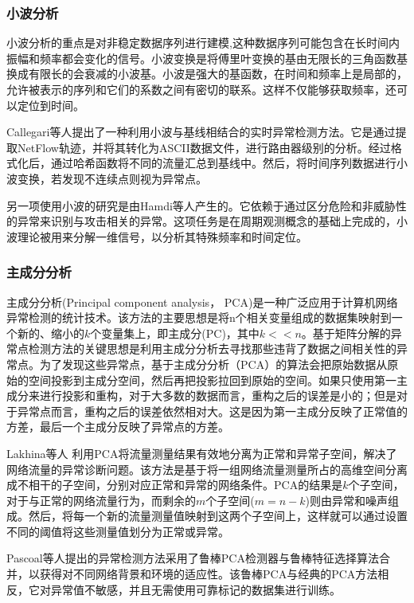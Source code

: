\subsubsection{小波分析} 
小波分析的重点是对非稳定数据序列进行建模,这种数据序列可能包含在长时间内振幅和频率都会变化的信号。小波变换是将傅里叶变换的基由无限长的三角函数基换成有限长的会衰减的小波基。小波是强大的基函数，在时间和频率上是局部的，允许被表示的序列和它们的系数之间有密切的联系。这样不仅能够获取频率，还可以定位到时间。


Callegari等人\cite{callegari2011combining}提出了一种利用小波与基线相结合的实时异常检测方法。它是通过提取NetFlow轨迹，并将其转化为ASCII数据文件，进行路由器级别的分析。经过格式化后，通过哈希函数将不同的流量汇总到基线中。然后，将时间序列数据进行小波变换，若发现不连续点则视为异常点。

另一项使用小波的研究是由Hamdi等人\cite{hamdi2007detecting}产生的。它依赖于通过区分危险和非威胁性的异常来识别与攻击相关的异常。这项任务是在周期观测概念的基础上完成的，小波理论被用来分解一维信号，以分析其特殊频率和时间定位。

\subsubsection{主成分分析}
主成分分析(Principal component analysis， PCA)是一种广泛应用于计算机网络异常检测的统计技术。该方法的主要思想是将n个相关变量组成的数据集映射到一个新的、缩小的$k$个变量集上，即主成分(PC)，其中$k<<n$。基于矩阵分解的异常点检测方法的关键思想是利用主成分分析去寻找那些违背了数据之间相关性的异常点。为了发现这些异常点，基于主成分分析（PCA）的算法会把原始数据从原始的空间投影到主成分空间，然后再把投影拉回到原始的空间。如果只使用第一主成分来进行投影和重构，对于大多数的数据而言，重构之后的误差是小的；但是对于异常点而言，重构之后的误差依然相对大。这是因为第一主成分反映了正常值的方差，最后一个主成分反映了异常点的方差。

Lakhina等人\cite{lakhina2004diagnosing} 利用PCA将流量测量结果有效地分离为正常和异常子空间，解决了网络流量的异常诊断问题。该方法是基于将一组网络流量测量所占的高维空间分离成不相干的子空间，分别对应正常和异常的网络条件。PCA的结果是$k$个子空间，对于与正常的网络流量行为，而剩余的$m$个子空间($m=n-k$)则由异常和噪声组成。然后，将每一个新的流量测量值映射到这两个子空间上，这样就可以通过设置不同的阈值将这些测量值划分为正常或异常。

Pascoal等人\cite{pascoal2012robust}提出的异常检测方法采用了鲁棒PCA检测器与鲁棒特征选择算法合并，以获得对不同网络背景和环境的适应性。该鲁棒PCA与经典的PCA方法相反，它对异常值不敏感，并且无需使用可靠标记的数据集进行训练。

